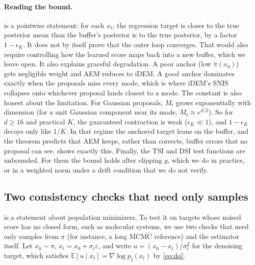 \paragraph{Reading the bound.}
 is a pointwise statement: for each $x_t$, the regression target is closer to the true posterior mean than the buffer's posterior is to the true posterior, by a factor $1-\epsilon_K$. It does not by itself prove that the outer loop converges. That would also require controlling how the learned score maps back into a new buffer, which we leave open.
It also explains graceful degradation. A poor anchor (low $\tilde\pi(x_0)$) gets negligible weight and AEM reduces to iDEM. A good anchor dominates exactly when the proposals miss every mode, which is where iDEM's SNIS collapses onto whichever proposal lands closest to a mode.
The constant is also honest about the limitation. For Gaussian proposals, $M_t$ grows exponentially with dimension (for a unit Gaussian component near its mode, $M_t\approx e^{d/2}$). So for $d\ge16$ and practical $K$, the guaranteed contraction is weak ($\epsilon_K\ll1$), and $1-\epsilon_K$ decays only like $1/K$. In that regime the anchored target leans on the buffer, and the theorem predicts that AEM keeps, rather than corrects, buffer errors that no proposal can see.  shows exactly this.
Finally, the TSI and DSI test functions are unbounded. For them the bound holds after clipping $g$, which we do in practice, or in a weighted norm under a drift condition that we do not verify.

\subsection{Two consistency checks that need only samples}
\label{sec:diagnostics}
 is a statement about population minimizers. To test it on targets whose noised score has no closed form, such as molecular systems, we use two checks that need only samples from $\pi$ (for instance, a long MCMC reference) and the estimator itself. Let $x_0\sim\pi$, $x_t=x_0+\sigma_t\varepsilon$, and write $u=(x_0-x_t)/\sigma_t^2$ for the denoising target, which satisfies $\mathbb{E}[u\mid x_t]=\nabla\log p_t(x_t)$ by \eqref{eq:dsi}.

